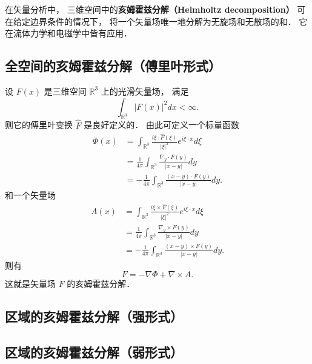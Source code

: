 
\begin{issues}
\issueDraft
\end{issues}


在矢量分析中， 三维空间中的\textbf{亥姆霍兹分解（Helmholtz decomposition）} 可在给定边界条件的情况下， 将一个矢量场唯一地分解为无旋场和无散场的和． 它在流体力学和电磁学中皆有应用．

\subsection{全空间的亥姆霍兹分解（傅里叶形式）}
设 $F(x)$ 是三维空间 $\mathbb{R}^3$ 上的光滑矢量场， 满足
$$
\int_{\mathbb{R}^3}|F(x)|^2dx<\infty.
$$
则它的傅里叶变换 $\hat F$ 是良好定义的． 由此可定义一个标量函数
$$
\begin{aligned}
\Phi(x)
&=\int_{\mathbb{R}^3}\frac{i\xi\cdot\hat F(\xi)}{|\xi|^2}e^{i\xi\cdot x}d\xi\\
&=\frac{1}{4\pi}\int_{\mathbb{R}^3}\frac{\nabla_y\cdot F(y)}{|x-y|}dy\\
&=-\frac{1}{4\pi}\int_{\mathbb{R}^3}\frac{(x-y)\cdot F(y)}{|x-y|}dy.
\end{aligned}
$$
和一个矢量场
$$
\begin{aligned}
A(x)
&=\int_{\mathbb{R}^3}\frac{i\xi\times\hat F(\xi)}{|\xi|^2}e^{i\xi\cdot x}d\xi\\
&=\frac{1}{4\pi}\int_{\mathbb{R}^3}\frac{\nabla_y\times F(y)}{|x-y|}dy\\
&=-\frac{1}{4\pi}\int_{\mathbb{R}^3}\frac{(x-y)\times F(y)}{|x-y|}dy.
\end{aligned}
$$
则有
$$
F=-\nabla\Phi+\nabla\times A.
$$
这就是矢量场 $F$ 的亥姆霍兹分解．

\subsection{区域的亥姆霍兹分解（强形式）}

\subsection{区域的亥姆霍兹分解（弱形式）}
